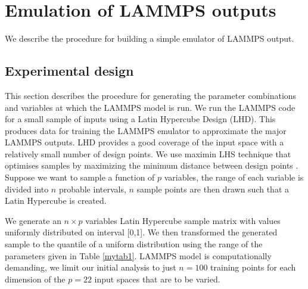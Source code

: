 \documentclass[12pt,titlepage]{report}
\theoremstyle{definition}
\theoremstyle{remark}
\begin{document}
\chapter{Emulation of LAMMPS outputs}
We describe the procedure for building a simple emulator of LAMMPS output.
\section{Experimental design}
This section describes the procedure for generating the parameter combinations and variables at which the LAMMPS model is run. We run the LAMMPS code for a small sample of inputs using a Latin Hypercube Design (LHD). This produces data for training the LAMMPS emulator to approximate the major LAMMPS outputs. LHD provides a good coverage of the input space with a relatively small number of design points. We use maximin LHS technique that optimises samples by maximizing the minimum distance between design points \citet{pd5}. Suppose we want to sample a function of $p$ variables, the range of each variable is divided into $n$ probable intervals, $n$ sample points are then drawn such that a Latin Hypercube is created.

We generate an $n \times p$ variables Latin Hypercube sample matrix with values uniformly distributed on interval [0,1]. We then transformed the generated sample to the quantile of a uniform distribution using the range of the parameters given in Table \ref{mytab1}.  LAMMPS model is computationally demanding, we limit our initial analysis to just $n=100$ training points for each dimension of the $p=22$ input spaces that are to be varied. %

\end{document}
